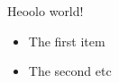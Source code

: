 \documentclass{article}
\begin{document}

Heoolo world!

\begin{itemize}
\item The first item
\item The second etc 
\end{itemize}
\end{document}
